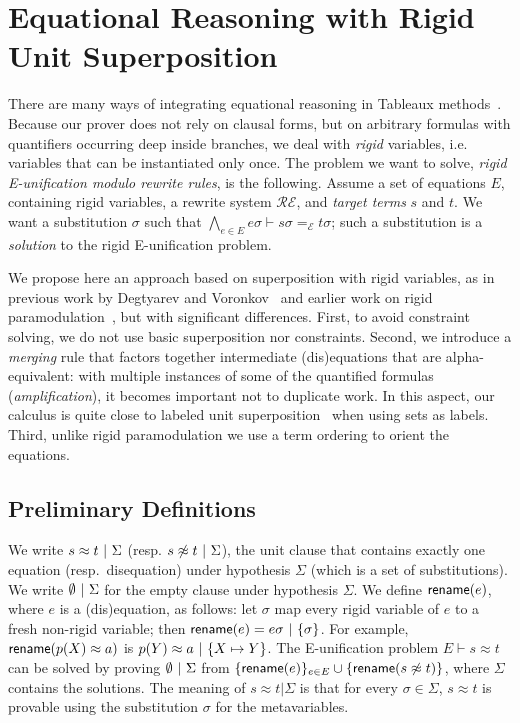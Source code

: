 
\section{Equational Reasoning with Rigid Unit Superposition}
\label{sec:super}

There are many ways of integrating equational reasoning in Tableaux
methods~\cite{DB75,LS02,BR15,DV96}. Because our prover does not rely on clausal
forms, but on arbitrary formulas with quantifiers occurring deep inside
branches, we deal with {\em rigid} variables, i.e. variables that can be
instantiated only once. The problem we want to solve, {\em rigid E-unification
modulo rewrite rules}, is the following. Assume a set of equations $E$,
containing rigid variables, a rewrite system $\mathcal{RE}$, and {\em target
terms} $s$ and $t$. We want a substitution $\sigma$ such that
$\bigwedge_{e \in E} e\sigma \vdash s\sigma =_\mathcal{E} t\sigma$; such a
substitution is a {\em solution} to the rigid E-unification problem.

We propose here an approach based on superposition with rigid variables, as in
previous work by Degtyarev and Voronkov~\cite{DV96} and earlier work on rigid
paramodulation~\cite{DAP00}, but with significant differences. First, to avoid
constraint solving, we do not use basic superposition nor constraints. Second,
we introduce a {\em merging} rule that factors together intermediate
(dis)equations that are alpha-equivalent: with multiple instances of some of the
quantified formulas ({\em amplification}), it becomes important not to duplicate
work. In this aspect, our calculus is quite close to labeled unit
superposition~\cite{KS10} when using sets as labels. Third, unlike rigid
paramodulation we use a term ordering to orient the equations.


\subsection{Preliminary Definitions}

We write $  s \approx t  ~|~  \Sigma$ (resp.
$ s \not\approx t  ~|~  \Sigma$), the unit clause that contains
exactly one equation (resp.~disequation) under hypothesis $\Sigma$ (which is a
set of substitutions). We write $\emptyset ~|~ \Sigma$ for the
empty clause under hypothesis $\Sigma$. We define $\textsf{rename}(e)$, where $e$
is a (dis)equation, as follows: let $\sigma$ map every rigid variable of $e$ to
a fresh non-rigid variable; then
$\textsf{rename}(e) =  e\sigma  ~|~  \{ \sigma \} $. For example,
$\textsf{rename}(p(X)\approx a)$ is $ p(Y)\approx a ~|~  \{ X\mapsto
Y\} $. The E-unification problem $E \vdash s\approx t$ can be solved by proving
$\emptyset  ~|~  \Sigma$ from
$\{ \textsf{rename}(e) \}_{ e \in E } \cup \{ \textsf{rename}( s \not\approx t ) \}$,
where $\Sigma$ contains the solutions. The meaning of $s \approx t | \Sigma$ is
that for every $\sigma \in \Sigma$, $s \approx t$ is provable using the
substitution $\sigma$ for the metavariables.

